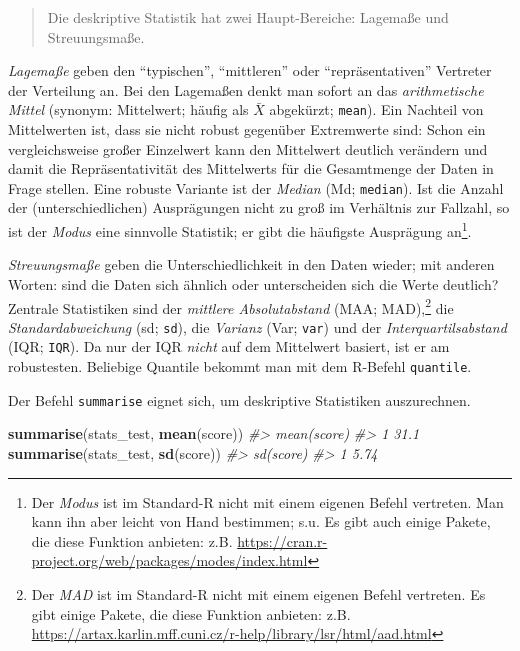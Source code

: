 \documentclass[12pt,ngerman,]{book}
\makeatletter
\newenvironment{Shaded}{\begin{snugshade}}{\end{snugshade}}
\newcommand{\KeywordTok}[1]{\textcolor[rgb]{0.13,0.29,0.53}{\textbf{{#1}}}}
\newcommand{\CommentTok}[1]{\textcolor[rgb]{0.56,0.35,0.01}{\textit{{#1}}}}
\newcommand{\NormalTok}[1]{{#1}}
\let\rmarkdownfootnote\footnote%
\def\footnote{\protect\rmarkdownfootnote}
\newenvironment{kframe}{%
\medskip{}
\setlength{\fboxsep}{.8em}
 \def\at@end@of@kframe{}%
 \ifinner\ifhmode%
  \def\at@end@of@kframe{\end{minipage}}%
  \begin{minipage}{\columnwidth}%
 \fi\fi%
 \def\FrameCommand##1{\hskip\@totalleftmargin \hskip-\fboxsep
 \colorbox{shadecolor}{##1}\hskip-\fboxsep
     \hskip-\linewidth \hskip-\@totalleftmargin \hskip\columnwidth}%
 \MakeFramed {\advance\hsize-\width
   \@totalleftmargin\z@ \linewidth\hsize
   \@setminipage}}%
 {\par\unskip\endMakeFramed%
 \at@end@of@kframe}
\renewenvironment{Shaded}{\begin{kframe}}{\end{kframe}}
\makeatother
\begin{document}
\begin{quote}
Die deskriptive Statistik hat zwei Haupt-Bereiche: Lagemaße und
Streuungsmaße.
\end{quote}

\emph{Lagemaße} geben den ``typischen'', ``mittleren'' oder
``repräsentativen'' Vertreter der Verteilung an. Bei den
Lagemaßen denkt man sofort an das \emph{arithmetische
Mittel} (synonym: Mittelwert; häufig als \(\bar{X}\) abgekürzt;
\texttt{mean}). Ein Nachteil von Mittelwerten ist, dass sie nicht robust
gegenüber Extremwerte sind: Schon ein vergleichsweise großer Einzelwert
kann den Mittelwert deutlich verändern und damit die Repräsentativität
des Mittelwerts für die Gesamtmenge der Daten in Frage stellen. Eine
robuste Variante ist der \emph{Median} (Md; \texttt{median}). Ist die
Anzahl der (unterschiedlichen) Ausprägungen nicht zu groß im Verhältnis
zur Fallzahl, so ist der \emph{Modus} eine sinnvolle Statistik; er gibt
die häufigste Ausprägung an\footnote{Der \emph{Modus} ist im Standard-R
  nicht mit einem eigenen Befehl vertreten. Man kann ihn aber leicht von
  Hand bestimmen; s.u. Es gibt auch einige Pakete, die diese Funktion
  anbieten: z.B.
  \url{https://cran.r-project.org/web/packages/modes/index.html}}.

\emph{Streuungsmaße} geben die Unterschiedlichkeit
in den Daten wieder; mit anderen Worten: sind die Daten sich ähnlich
oder unterscheiden sich die Werte deutlich? Zentrale Statistiken sind
der \emph{mittlere Absolutabstand} (MAA; MAD),\footnote{Der \emph{MAD}
  ist im Standard-R nicht mit einem eigenen Befehl vertreten. Es gibt
  einige Pakete, die diese Funktion anbieten: z.B.
  \url{https://artax.karlin.mff.cuni.cz/r-help/library/lsr/html/aad.html}}
die \emph{Standardabweichung} (sd; \texttt{sd}), die \emph{Varianz}
(Var; \texttt{var}) und der \emph{Interquartilsabstand} (IQR;
\texttt{IQR}). Da nur der IQR \emph{nicht} auf dem Mittelwert basiert,
ist er am robustesten. Beliebige Quantile bekommt man mit dem R-Befehl
\texttt{quantile}.

Der Befehl \texttt{summarise} eignet sich, um deskriptive Statistiken
auszurechnen.

\begin{Shaded}
\begin{Highlighting}[]
\KeywordTok{summarise}\NormalTok{(stats_test, }\KeywordTok{mean}\NormalTok{(score))}
\CommentTok{#>   mean(score)}
\CommentTok{#> 1        31.1}
\KeywordTok{summarise}\NormalTok{(stats_test, }\KeywordTok{sd}\NormalTok{(score))}
\CommentTok{#>   sd(score)}
\CommentTok{#> 1      5.74}
\end{Highlighting}
\end{Shaded}
\end{document}
